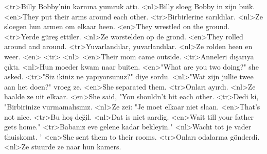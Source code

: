 <tr>Billy Bobby'nin karnına yumruk attı.
<nl>Billy sloeg Bobby in zijn buik.
<en>They put their arms around each other.
<tr>Birbirlerine sarıldılar.
<nl>Ze sloegen hun armen om elkaar heen.
<en>They wrestled on the ground.
<tr>Yerde güreş ettiler.
<nl>Ze worstelden op de grond.
<en>They rolled around and around.
<tr>Yuvarlandılar, yuvarlandılar.
<nl>Ze rolden heen en weer.
<en>
<tr>
<nl>
<en>Their mom came outside.
<tr>Anneleri dışarıya çıktı.
<nl>Hun moeder kwam naar buiten.
<en>"What are you two doing?" she asked.
<tr>"Siz ikiniz ne yapıyorsunuz?" diye sordu.
<nl>"Wat zijn jullie twee aan het doen?" vroeg ze.
<en>She separated them.
<tr>Onları ayırdı.
<nl>Ze haalde ze uit elkaar.
<en>She said, "You shouldn't hit each other.
<tr>Dedi ki, "Birbirinize vurmamalısınız.
<nl>Ze zei: "Je moet elkaar niet slaan.
<en>That's not nice.
<tr>Bu hoş değil.
<nl>Dat is niet aardig.
<en>Wait till your father gets home."
<tr>Babanız eve gelene kadar bekleyin."
<nl>Wacht tot je vader thuiskomt. '
<en>She sent them to their rooms.
<tr>Onları odalarına gönderdi.
<nl>Ze stuurde ze naar hun kamers.
